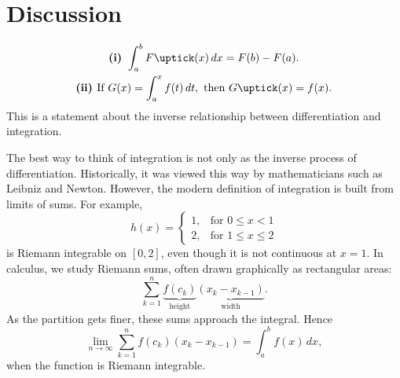 
\section{Discussion}


\begin{example}
    \begin{gather*}
        \textbf{(i) } \int_a^b F\uptick(x)\,dx = F(b) - F(a).\\
        \textbf{(ii) } \text{If } G(x) = \int_a^x f(t)\,dt,\text{ then } G\uptick(x) = f(x).\\
    \end{gather*}
    This is a statement about the inverse relationship between differentiation and integration.
\end{example}

\begin{remark}
    The best way to think of integration is not only as the inverse process of differentiation.
    Historically, it was viewed this way by mathematicians such as Leibniz and Newton.
    However, the modern definition of integration is built from limits of sums.
    For example,
    \[
        h(x) = \begin{cases}
                   1,&\text{for } 0\leq x<1\\
                   2,&\text{for } 1\leq x\leq 2
        \end{cases}
    \]
    is Riemann integrable on $[0,2]$, even though it is not continuous at $x=1$.
    In calculus, we study Riemann sums, often drawn graphically as rectangular areas:
    \[
        \sum_{k=1}^n \underbrace{f(c_k)}_{\text{height}} \underbrace{(x_k - x_{k-1})}_{\text{width}}.
    \]
    As the partition gets finer, these sums approach the integral.
    Hence
    \[
        \lim_{n\to\infty} \sum_{k=1}^n f(c_k)(x_k - x_{k-1}) = \int_a^b f(x)\,dx,
    \]
    when the function is Riemann integrable.
\end{remark}